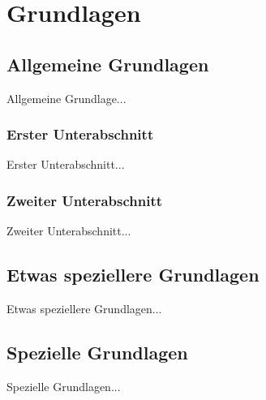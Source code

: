 \chapter{Grundlagen}

\section{Allgemeine Grundlagen}

Allgemeine Grundlage...

\subsection{Erster Unterabschnitt}

Erster Unterabschnitt...

\subsection{Zweiter Unterabschnitt}

Zweiter Unterabschnitt...

\section{Etwas speziellere Grundlagen}

Etwas speziellere Grundlagen...

\section{Spezielle Grundlagen}

Spezielle Grundlagen...